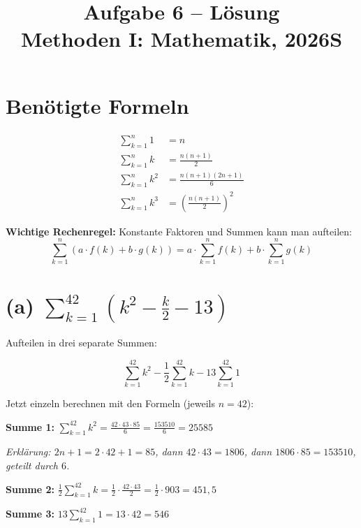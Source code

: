 \documentclass[12pt, a4paper]{article}
\title{\textbf{Aufgabe 6 -- Lösung} \\ Methoden I: Mathematik, 2026S}
\author{}
\date{}
\begin{document}
\maketitle

\section*{Benötigte Formeln}

\begin{align}
    \sum_{k=1}^{n} 1 &= n \\[6pt]
    \sum_{k=1}^{n} k &= \frac{n(n+1)}{2} \\[6pt]
    \sum_{k=1}^{n} k^2 &= \frac{n(n+1)(2n+1)}{6} \\[6pt]
    \sum_{k=1}^{n} k^3 &= \left(\frac{n(n+1)}{2}\right)^2
\end{align}

\textbf{Wichtige Rechenregel:} Konstante Faktoren und Summen kann man aufteilen:
\[
    \sum_{k=1}^{n} (a \cdot f(k) + b \cdot g(k)) = a \cdot \sum_{k=1}^{n} f(k) + b \cdot \sum_{k=1}^{n} g(k)
\]

\section*{(a) $\displaystyle\sum_{k=1}^{42} \left(k^2 - \frac{k}{2} - 13\right)$}

Aufteilen in drei separate Summen:

\[
    \sum_{k=1}^{42} k^2 - \frac{1}{2} \sum_{k=1}^{42} k - 13 \sum_{k=1}^{42} 1
\]

Jetzt einzeln berechnen mit den Formeln (jeweils $n = 42$):

\bigskip

\textbf{Summe 1:} $\displaystyle\sum_{k=1}^{42} k^2 = \frac{42 \cdot 43 \cdot 85}{6} = \frac{153510}{6} = 25585$

\textit{Erklärung: $2n + 1 = 2 \cdot 42 + 1 = 85$, dann $42 \cdot 43 = 1806$, dann $1806 \cdot 85 = 153510$, geteilt durch $6$.}

\bigskip

\textbf{Summe 2:} $\displaystyle\frac{1}{2} \sum_{k=1}^{42} k = \frac{1}{2} \cdot \frac{42 \cdot 43}{2} = \frac{1}{2} \cdot 903 = 451{,}5$

\bigskip

\textbf{Summe 3:} $\displaystyle 13 \sum_{k=1}^{42} 1 = 13 \cdot 42 = 546$

\bigskip
\end{document}
